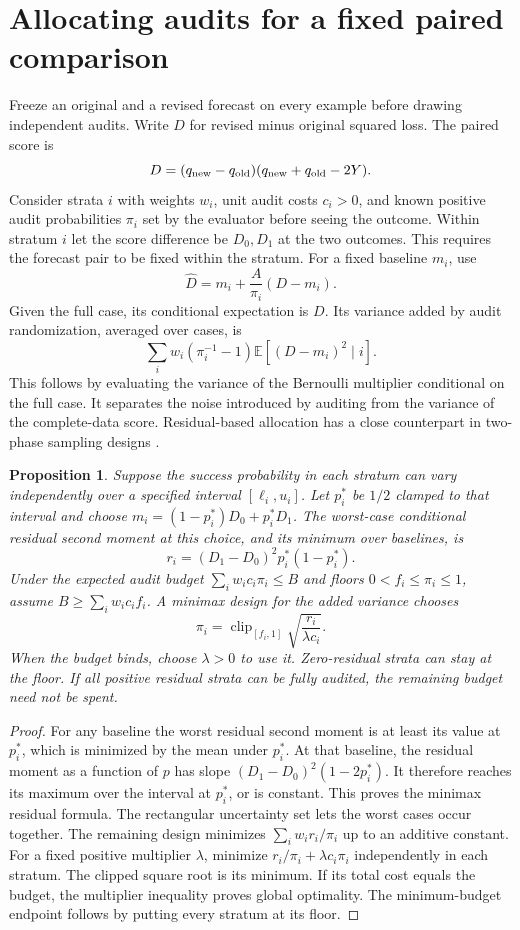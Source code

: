 \documentclass[11pt]{article}
\newtheorem{proposition}{Proposition}
\begin{document}
\section{Allocating audits for a fixed paired comparison}
Freeze an original and a revised forecast on every example
before drawing independent audits. Write $D$ for revised minus
original squared loss. The paired score is
\[
 D=(q_{\rm new}-q_{\rm old})(q_{\rm new}+q_{\rm old}-2Y).
\]
Consider strata $i$ with weights $w_i$, unit audit costs $c_i>0$,
and known positive audit probabilities $\pi_i$ set by the
evaluator before seeing the outcome. Within stratum $i$ let
the score difference be $D_0,D_1$ at the two outcomes. This
requires the forecast pair to be fixed within the stratum.
For a fixed baseline $m_i$, use
\[
 \widehat D=m_i+\frac{A}{\pi_i}(D-m_i).
\]
Given the full case, its conditional expectation is $D$.
Its variance added by audit randomization, averaged over cases,
is
\[
 \sum_i w_i(\pi_i^{-1}-1)
       \mathbb E[(D-m_i)^2\mid i].
\]
This follows by evaluating the variance of the Bernoulli
multiplier conditional on the full case. It separates the noise
introduced by auditing from the variance of the complete-data
score. Residual-based allocation has a close counterpart in
two-phase sampling designs \cite{chen}.

\begin{proposition}
Suppose the success probability in each stratum can vary
independently over a specified interval $[\ell_i,u_i]$.
Let $p_i^*$ be $1/2$ clamped to that interval and choose
$m_i=(1-p_i^*)D_0+p_i^*D_1$. The worst-case conditional
residual second moment at this choice, and its minimum over
baselines, is
\[
 r_i=(D_1-D_0)^2p_i^*(1-p_i^*).
\]
Under the expected audit budget $\sum_i w_ic_i\pi_i\le B$
and floors $0<f_i\le\pi_i\le1$, assume
$B\ge\sum_i w_ic_if_i$. A minimax design for the
added variance chooses
\[
 \pi_i=\operatorname{clip}_{[f_i,1]}
       \sqrt{\frac{r_i}{\lambda c_i}}.
\]
When the budget binds, choose $\lambda>0$ to use it.
Zero-residual strata can stay at the floor. If all positive
residual strata can be fully audited, the remaining budget
need not be spent.
\end{proposition}
\begin{proof}
For any baseline the worst residual second moment is at
least its value at $p_i^*$, which is minimized by the mean
under $p_i^*$. At that baseline, the residual moment as a
function of $p$ has slope $(D_1-D_0)^2(1-2p_i^*)$. It
therefore reaches its maximum over the interval at $p_i^*$,
or is constant. This proves the minimax residual formula.
The rectangular uncertainty set lets the worst cases occur
together. The remaining design minimizes
$\sum_i w_ir_i/\pi_i$ up to an additive constant. For a
fixed positive multiplier $\lambda$, minimize
$r_i/\pi_i+\lambda c_i\pi_i$ independently in each stratum.
The clipped square root is its minimum. If its total cost
equals the budget, the multiplier inequality proves global
optimality. The minimum-budget endpoint follows by putting
every stratum at its floor.
\end{proof}
\end{document}
